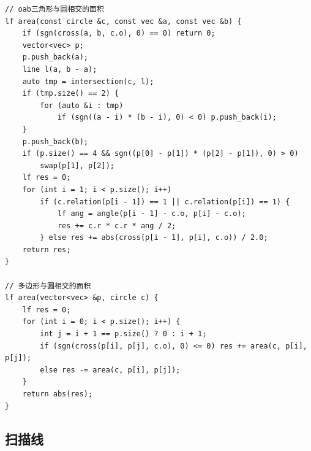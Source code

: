 \documentclass[UTF8]{ctexart}
\begin{document}
\begin{sloppypar}
\begin{lstlisting}[style=cpp]
// oab三角形与圆相交的面积
lf area(const circle &c, const vec &a, const vec &b) {
    if (sgn(cross(a, b, c.o), 0) == 0) return 0;
    vector<vec> p;
    p.push_back(a);
    line l(a, b - a);
    auto tmp = intersection(c, l);
    if (tmp.size() == 2) {
        for (auto &i : tmp)
            if (sgn((a - i) * (b - i), 0) < 0) p.push_back(i);
    }
    p.push_back(b);
    if (p.size() == 4 && sgn((p[0] - p[1]) * (p[2] - p[1]), 0) > 0)
        swap(p[1], p[2]);
    lf res = 0;
    for (int i = 1; i < p.size(); i++)
        if (c.relation(p[i - 1]) == 1 || c.relation(p[i]) == 1) {
            lf ang = angle(p[i - 1] - c.o, p[i] - c.o);
            res += c.r * c.r * ang / 2;
        } else res += abs(cross(p[i - 1], p[i], c.o)) / 2.0;
    return res;
}

// 多边形与圆相交的面积
lf area(vector<vec> &p, circle c) {
    lf res = 0;
    for (int i = 0; i < p.size(); i++) {
        int j = i + 1 == p.size() ? 0 : i + 1;
        if (sgn(cross(p[i], p[j], c.o), 0) <= 0) res += area(c, p[i], p[j]);
        else res -= area(c, p[i], p[j]);
    }
    return abs(res);
}
\end{lstlisting}

\subsection{扫描线}


\end{sloppypar}
\end{document}
